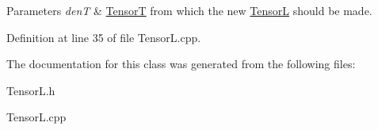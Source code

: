 \begin{DoxyParams}{Parameters}
{\em den\-T} & \hyperlink{classCheMPS2_1_1TensorT}{Tensor\-T} from which the new \hyperlink{classCheMPS2_1_1TensorL}{Tensor\-L} should be made. \\
\hline
\end{DoxyParams}


Definition at line 35 of file Tensor\-L.\-cpp.



The documentation for this class was generated from the following files\-:\begin{DoxyCompactItemize}
\item 
Tensor\-L.\-h\item 
Tensor\-L.\-cpp\end{DoxyCompactItemize}
